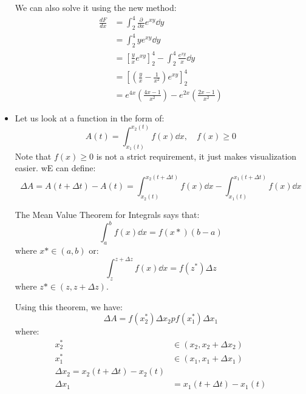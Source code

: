 \begin{itemize}
\begin{example}
        We can also solve it using the new method:
        \begin{align}
            \frac{dF}{dx} &= \int_2^4 \frac{\partial}{\partial x}e^{xy} \dd{y} \\ 
            &= \int_2^4 ye^{xy} \dd{y} \\ 
            &= \left[\frac{y}{x}e^{xy}\right]^4_2 - \int_2^4 \frac{e^{xy}}{x}\dd{y} \\ 
            &= \left[\left(\frac{y}{x}-\frac{1}{x^2}\right)e^{xy}\right]^4_2 \\ 
            &= e^{4x} \left(\frac{4x-1}{x^2}\right)-e^{2x} \left(\frac{2x-1}{x^2}\right)
        \end{align}
    \end{example}
    \item Let us look at a function in the form of:
    \begin{equation}
        A(t) = \int_{x_1(t)}^{x_2(t)} f(x) \dd{x},\quad f(x) \ge 0
    \end{equation}
    Note that $f(x) \ge 0$ is not a strict requirement, it just makes visualization easier. wE can define:
    \begin{equation}
        \Delta A = A(t+\Delta t) - A(t) = \int_{x_2(t)}^{x_2(t+\Delta t)} f(x) \dd{x} - \int_{x_1(t)}^{x_1(t+\Delta t)} f(x) \dd{x}
    \end{equation}
    \begin{theorem}
        The Mean Value Theorem for Integrals says that:
        \begin{equation}
            \int_a^b f(x) \dd{x} = f(x*) (b-a)
        \end{equation}
        where $x* \in (a,b)$ or:
        \begin{equation}
            \int_z^{z+\Delta z} f(x) \dd{x} = f(z^*) \Delta z
        \end{equation}
        where $z* \in (z,z+\Delta z)$.
    \end{theorem}
    Using this theorem, we have:
    \begin{equation}
        \Delta A = f(x_2^*)\Delta x_2 p f(x_1^*)\Delta x_1
    \end{equation}
    where:
    \begin{align}
        x_2^* &\in (x_2, x_2 + \Delta x_2) \\ 
        x_1^* &\in (x_1, x_1 + \Delta x_1) \\ 
        \Delta x_2 = x_2(t+\Delta t) - x_2(t) \\ 
        \Delta x_1 &= x_1(t+\Delta t) - x_1(t)

\end{align}
\end{itemize}

